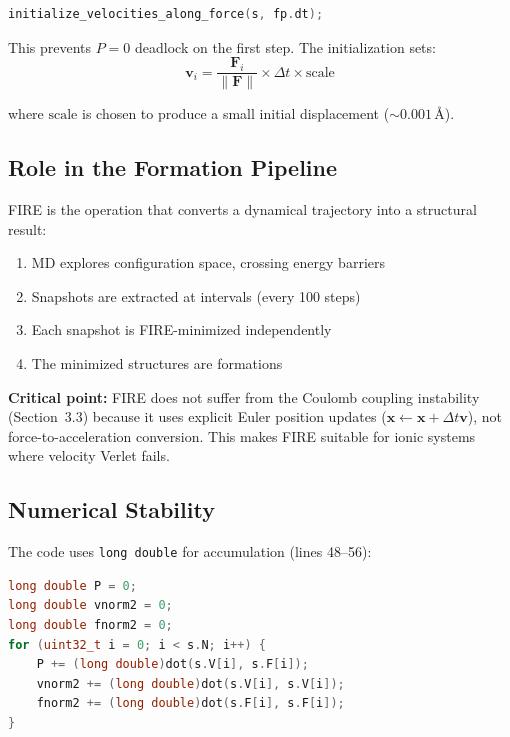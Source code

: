 \documentclass[11pt]{article}
\begin{document}
\begin{lstlisting}[language=C++]
initialize_velocities_along_force(s, fp.dt);
\end{lstlisting}

This prevents $P = 0$ deadlock on the first step. The initialization sets:
\begin{equation}
\mathbf{v}_i = \frac{\mathbf{F}_i}{\|\mathbf{F}\|} \times \Delta t \times \text{scale}
\end{equation}

where $\text{scale}$ is chosen to produce a small initial displacement ($\sim 0.001$\,\AA).

\subsection{Role in the Formation Pipeline}

FIRE is the operation that converts a dynamical trajectory into a structural result:

\begin{enumerate}
\item MD explores configuration space, crossing energy barriers
\item Snapshots are extracted at intervals (every 100 steps)
\item Each snapshot is FIRE-minimized independently
\item The minimized structures are formations
\end{enumerate}

\textbf{Critical point:} FIRE does not suffer from the Coulomb coupling instability (Section~3.3) because it uses explicit Euler position updates ($\mathbf{x} \gets \mathbf{x} + \Delta t \mathbf{v}$), not force-to-acceleration conversion. This makes FIRE suitable for ionic systems where velocity Verlet fails.

\subsection{Numerical Stability}

The code uses \texttt{long double} for accumulation (lines 48--56):

\begin{lstlisting}[language=C++]
long double P = 0;
long double vnorm2 = 0;
long double fnorm2 = 0;
for (uint32_t i = 0; i < s.N; i++) {
    P += (long double)dot(s.V[i], s.F[i]);
    vnorm2 += (long double)dot(s.V[i], s.V[i]);
    fnorm2 += (long double)dot(s.F[i], s.F[i]);
}
\end{lstlisting}
\end{document}
